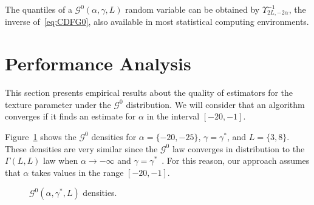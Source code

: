 \documentclass[twocolumn]{svjour3}
\begin{document}
The quantiles of a $\mathcal G^0(\alpha,\gamma,L)$ random variable can be obtained by $\Upsilon^{-1}_{2L,-2\alpha}$, the inverse of~\eqref{eq:CDFG0}, also available in most statistical computing environments.


\section{Performance Analysis}\label{simulation}

This section presents empirical results about the quality of estimators for the texture parameter under the $\mathcal G^0$ distribution. 
We will consider that an algorithm converges if it finds an estimate for $\alpha$ in the interval $[-20,-1]$.	

Figure~\ref{densidades} shows the $\mathcal{G}^0$ densities for  $\alpha=\{-20,-25\}$, $\gamma=\gamma^*$, and $L=\{3,8\}$. 
These densities are very similar since the $\mathcal{G}^0$ law converges in distribution to the $\Gamma(L,L)$ law when $\alpha \to -\infty$ and $\gamma=\gamma^*$~\cite{Frery99}. 
For this reason, our approach assumes that $\alpha$ takes values in the range $[-20,-1]$. 

\begin{figure}[htb]
	\centering
	\caption{\label{densidades} $\mathcal{G}^0(\alpha,\gamma^*,L)$ densities.}
\end{figure}
\end{document}
